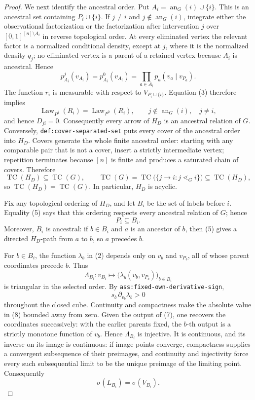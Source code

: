 \documentclass{article}
\begin{document}
\begin{proof}
We next identify the ancestral order.  Put \(A_i=\operatorname{an}_G(i)\cup\{i\}\).  This is an ancestral set containing \(P_i\cup\{i\}\).  If \(j\ne i\) and \(j\notin\operatorname{an}_G(i)\), integrate either the observational factorization or the factorization after intervention \(j\) over \([0,1]^{[n]\setminus A_i}\) in reverse topological order.  At every eliminated vertex the relevant factor is a normalized conditional density, except at \(j\), where it is the normalized density \(q_j\); no eliminated vertex is a parent of a retained vertex because \(A_i\) is ancestral.  Hence
\[
 p^j_{A_i}(v_{A_i})=p^0_{A_i}(v_{A_i})
 =\prod_{a\in A_i}p_a(v_a\mid v_{P_a}).
\tag{3}
\]
The function \(r_i\) is measurable with respect to \(V_{P_i\cup\{i\}}\).  Equation (3) therefore implies
\[
 \operatorname{Law}_{P^j}(R_i)=\operatorname{Law}_{P^0}(R_i),
 \qquad j\notin\operatorname{an}_G(i),\quad j\ne i,
\tag{4}
\]
and hence \(D_{ji}=0\).  Consequently every arrow of \(H_D\) is an ancestral relation of \(G\).  Conversely, \texttt{def:cover-separated-set} puts every cover of the ancestral order into \(H_D\).  Covers generate the whole finite ancestral order: starting with any comparable pair that is not a cover, insert a strictly intermediate vertex; repetition terminates because \([n]\) is finite and produces a saturated chain of covers.  Therefore
\[
 \operatorname{TC}(H_D)\subseteq\operatorname{TC}(G),
 \qquad
 \operatorname{TC}(G)
 =\operatorname{TC}\bigl(\{j\to i:j\lessdot_G i\}\bigr)
 \subseteq\operatorname{TC}(H_D),
\tag{5}
\]
so \(\operatorname{TC}(H_D)=\operatorname{TC}(G)\).  In particular, \(H_D\) is acyclic.

Fix any topological ordering of \(H_D\), and let \(B_i\) be the set of labels before \(i\).  Equality (5) says that this ordering respects every ancestral relation of \(G\); hence
\[
 P_i\subseteq B_i.
\tag{6}
\]
Moreover, \(B_i\) is ancestral: if \(b\in B_i\) and \(a\) is an ancestor of \(b\), then (5) gives a directed \(H_D\)-path from \(a\) to \(b\), so \(a\) precedes \(b\).

For \(b\in B_i\), the function \(\lambda_b\) in (2) depends only on \(v_b\) and \(v_{P_b}\), all of whose parent coordinates precede \(b\).  Thus
\[
 \Lambda_{B_i}:v_{B_i}\longmapsto
 \bigl(\lambda_b(v_b,v_{P_b})\bigr)_{b\in B_i}
\tag{7}
\]
is triangular in the selected order.  By \texttt{ass:fixed-own-derivative-sign},
\[
 s_b\,\partial_{v_b}\lambda_b>0
\tag{8}
\]
throughout the closed cube.  Continuity and compactness make the absolute value in (8) bounded away from zero.  Given the output of (7), one recovers the coordinates successively: with the earlier parents fixed, the \(b\)-th output is a strictly monotone function of \(v_b\).  Hence \(\Lambda_{B_i}\) is injective.  It is continuous, and its inverse on its image is continuous: if image points converge, compactness supplies a convergent subsequence of their preimages, and continuity and injectivity force every such subsequential limit to be the unique preimage of the limiting point.  Consequently
\[
 \sigma(L_{B_i})=\sigma(V_{B_i}).
\tag{9}
\]


\end{proof}
\end{document}
